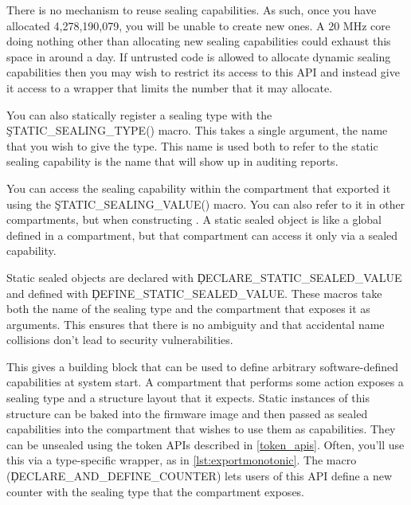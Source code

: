 \begin{caution}
There is no mechanism to reuse sealing capabilities.
As such, once you have allocated 4,278,190,079, you will be unable to create new ones.
A 20 MHz core doing nothing other than allocating new sealing capabilities could exhaust this space in around a day.
If untrusted code is allowed to allocate dynamic sealing capabilities then you may wish to restrict its access to this API and instead give it access to a wrapper that limits the number that it may allocate.
\end{caution}


You can also statically register a sealing type with the \c{STATIC_SEALING_TYPE()} macro.
This takes a single argument, the name that you wish to give the type.
This name is used both to refer to the static sealing capability is the name that will show up in auditing reports.


You can access the sealing capability within the compartment that exported it using the \c{STATIC_SEALING_VALUE()} macro.
You can also refer to it in other compartments, but  when constructing .
A static sealed object is like a global defined in a compartment, but that compartment can access it only via a sealed capability.

Static sealed objects are declared with \c{DECLARE_STATIC_SEALED_VALUE} and defined with \c{DEFINE_STATIC_SEALED_VALUE}.
These macros take both the name of the sealing type and the compartment that exposes it as arguments.
This ensures that there is no ambiguity and that accidental name collisions don't lead to security vulnerabilities.


This gives a building block that can be used to define arbitrary software-defined capabilities at system start.
A compartment that performs some action exposes a sealing type and a structure layout that it expects.
Static instances of this structure can be baked into the firmware image and then passed as sealed capabilities into the compartment that wishes to use them as capabilities.
They can be unsealed using the token APIs described in \ref{token_apis}.
Often, you'll use this via a type-specific wrapper, as in \ref{lst:exportmonotonic}.
The macro (\c{DECLARE_AND_DEFINE_COUNTER}) lets users of this API define a new counter with the sealing type that the compartment exposes.

